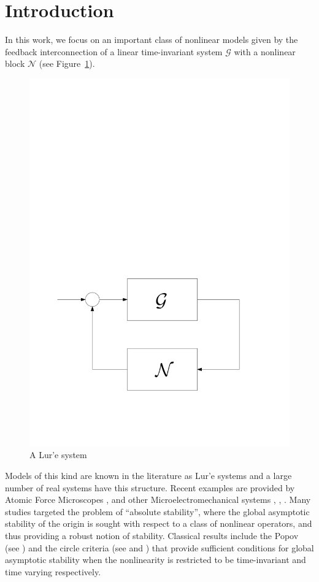 \documentclass[letterpaper,10pt,twocolumn,journal,final]{IEEEtran}
\begin{document}
\section{Introduction}\label{sec:intro}
In this work, we focus on an important class of nonlinear models given by the feedback interconnection of a linear time-invariant system $\mathcal{G}$ with a nonlinear block $\mathcal{N}$ (see Figure~\ref{fig:lur'e}).
\begin{figure}[hbt]
	\centering
	\includegraphics[width=0.75\columnwidth]{lure}
	\caption{A Lur'e system\label{fig:lur'e}}
\end{figure}
Models of this kind are known in the literature as Lur'e systems \cite{LurPos44} and a large number of real systems have this structure. Recent examples are provided by Atomic Force Microscopes \cite{SebSal01},\cite{SebGan05} and other Microelectromechanical systems \cite{WieSeb05}, \cite{SebWie08}, \cite{AgaSah08}.
Many studies targeted the problem of ``absolute stability'', where the global asymptotic stability of the origin is sought with respect to a class of nonlinear operators, and thus providing a robust notion of stability.
Classical results include the Popov (see \cite{Pop62}) and the circle criteria (see \cite{San64} and \cite{Zam66b}) that provide sufficient conditions for global asymptotic stability  when the nonlinearity is restricted to be  time-invariant and time varying respectively.
\end{document}

